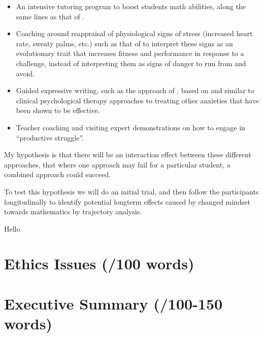 \documentclass[14pt]{memoir}
\begin{document}
\begin{itemize}
	\item An intensive tutoring program to boost students math abilities, along the same lines as that of .
	\item Coaching around reappraisal of physiological signs of stress (increased heart rate, sweaty palms, etc.) such as that of  to interpret these signs as an evolutionary trait that increases fitness and performance in response to a challenge, instead of interpreting them as signs of danger to run from and avoid.
	\item Guided expressive writing, such as the approach of , based on and similar to clinical psychological therapy approaches to treating other anxieties that have been shown to be effective.
	\item Teacher coaching and visiting expert demonstrations on how to engage in ``productive struggle''.
\end{itemize}

My hypothesis is that there will be an interaction effect between these different approaches, that where one approach may fail for a particular student, a combined approach could succeed. 

To test this hypothesis we will do an initial trial, and then follow the participants longitudinally to identify potential longterm effects
caused by changed mindset towards mathematics by trajectory analysis. 

Hello




\section{Ethics Issues (/100 words)}

\section{Executive Summary (/100-150 words)}



\printglossaries

\glsresetall

 
\end{document}
